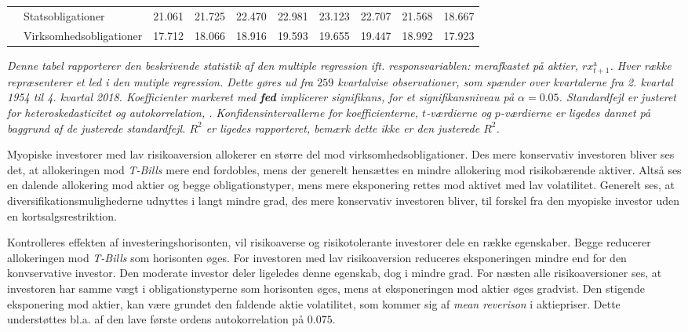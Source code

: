 \documentclass[
  a4paper,
  oneside]{memoir}
\begin{document}
\begin{table}[H]
{\begin{threeparttable}
\begin{tabular}[t]{llrrrrrrrr}
\rowcolor{gray!6}   & Statsobligationer & 21.061 & 21.725 & 22.470 & 22.981 & 23.123 & 22.707 & 21.568 & 18.667\\
 & Virksomhedsobligationer & 17.712 & 18.066 & 18.916 & 19.593 & 19.655 & 19.447 & 18.992 & 17.923\\
\bottomrule
\end{tabular}
\begin{tablenotes}
\item \textit{Denne tabel rapporterer den beskrivende statistik af den multiple regression ift. responsvariablen: merafkastet på aktier, $rx_{t+1}^{\text{a}}$. Hver række repræsenterer et led i den mutiple regression. Dette gøres ud fra $259$ kvartalvise observationer, som spænder over kvartalerne fra 2. kvartal 1954 til 4. kvartal 2018. Koefficienter markeret med \textbf{fed} implicerer signifikans, for et signifikansniveau på $\alpha=0.05$. Standardfejl er justeret for heteroskedasticitet og autokorrelation, \citep{Newey1987}. Konfidensintervallerne for koefficienterne, $t$-værdierne og $p$-værdierne er ligedes dannet på baggrund af de justerede standardfejl. $R^2$ er ligedes rapporteret, bemærk dette ikke er den justerede $R^2$.}
\end{tablenotes}
\end{threeparttable}}
\end{table}

Myopiske investorer med lav risikoaversion allokerer en større del mod virksomhedsobligationer. Des mere konservativ investoren bliver ses det, at allokeringen mod \emph{T-Bills} mere end fordobles, mens der generelt hensættes en mindre allokering mod risikobærende aktiver. Altså ses en dalende allokering mod aktier og begge obligationstyper, mens mere eksponering rettes mod aktivet med lav volatilitet. Generelt ses, at diversifikationsmulighederne udnyttes i langt mindre grad, des mere konservativ investoren bliver, til forskel fra den myopiske investor uden en kortsalgsrestriktion.

Kontrolleres effekten af investeringshorisonten, vil risikoaverse og risikotolerante investorer dele en række egenskaber. Begge reducerer allokeringen mod \emph{T-Bills} som horisonten øges. For investoren med lav risikoaversion reduceres eksponeringen mindre end for den konvservative investor. Den moderate investor deler ligeledes denne egenskab, dog i mindre grad. For næsten alle risikoaversioner ses, at investoren har samme vægt i obligationstyperne som horisonten øges, mens at eksponeringen mod aktier øges gradvist. Den stigende eksponering mod aktier, kan være grundet den faldende aktie volatilitet, som kommer sig af \emph{mean reverison} i aktiepriser. Dette understøttes bl.a. af den lave første ordens autokorrelation på \(0.075\).\\
\end{document}
